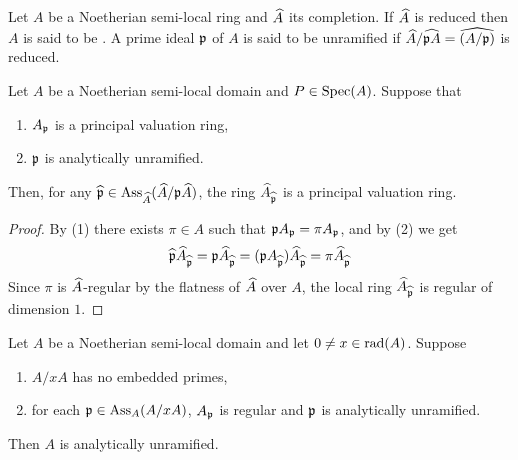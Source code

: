 \documentclass[../main]{subfiles}
\begin{document}
\newparagraph Let $A$ be a Noetherian semi-local ring and $\widehat{A}$ its completion. If $\widehat{A}$ is reduced then $A$ is said to be . A prime ideal $\mathfrak{p}$ of $A$ is said to be  unramified if $\widehat{A} / \widehat{\mathfrak{p}A}=\widehat{(A / \mathfrak{p})}$ is reduced.

\begin{lemma}\label{lem:31.01}Let $A$ be a Noetherian semi-local domain and $P \in \operatorname{Spec}(A)$. Suppose that
\begin{enumerate}[label = (\arabic*)]
    \item $A_{\mathfrak{p}}$ is a principal valuation ring,
    \item $\mathfrak{p}$ is analytically unramified.
\end{enumerate}
Then, for any $\widehat{\mathfrak{p}} \in \operatorname{Ass}_{\widehat{A}}(\widehat{A} / \mathfrak{p} \widehat{A})$, the ring $\widehat{A}_{\widehat{\mathfrak{p}}}$ is a principal valuation ring. 
\end{lemma}
\begin{proof} By (1) there exists $\pi \in A$ such that $\mathfrak{p} A_{\mathfrak{p}}=\pi A_{\mathfrak{p}}$, and by (2) we get \[\widehat{\mathfrak{p}} \widehat{A}_{\widehat{\mathfrak{p}}}=\mathfrak{p} \widehat{A}_{\widehat{\mathfrak{p}}}=(\mathfrak{p} A_{\widehat{\mathfrak{p}}})\widehat{A}_{\widehat{\mathfrak{p}}}=\pi \widehat{A}_{\widehat{\mathfrak{p}}}\] Since $\pi$ is $\widehat{A}$-regular by the flatness of $\widehat{A}$ over $A$, the local ring $\widehat{A}_{\widehat{\mathfrak{p}}}$ is regular of dimension $1 .$\end{proof}

\begin{lemma}\label{lem:31.02}
Let $A$ be a Noetherian semi-local domain and let $0 \neq x \in \operatorname{rad}(A)$. Suppose
\begin{enumerate}[label=(\roman*)]
    \item $A/xA$ has no embedded primes,
    \item for each $\mathfrak{p} \in \operatorname{Ass}_A(A / x A)$, $A_{\mathfrak{p}}$ is regular and $\mathfrak{p}$ is analytically unramified.
\end{enumerate}
Then $A$ is analytically unramified.
\end{lemma} 
\end{document}

